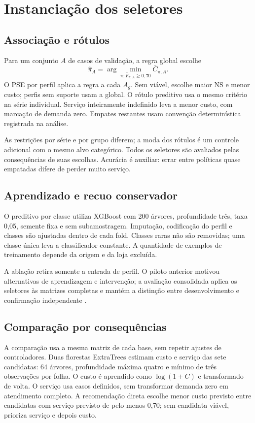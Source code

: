 \section{Instanciação dos seletores}
\label{sec:selecao_contextual}
\subsection{Associação e rótulos}
Para um conjunto $A$ de casos de validação, a regra global escolhe
\begin{equation}
 \hat\pi_A=\arg\min_{\pi:\bar F_{\pi,A}\geq0{,}70}\bar C_{\pi,A}.
 \label{eq:policy_selector}
\end{equation}
O PSE por perfil aplica a regra a cada $A_g$. Sem viável, escolhe maior NS e menor custo; perfis sem suporte usam a global. O rótulo preditivo usa o mesmo critério na série individual. Serviço inteiramente indefinido leva a menor custo, com marcação de demanda zero. Empates restantes usam convenção determinística registrada na análise.

As restrições por série e por grupo diferem; a moda dos rótulos é um controle adicional com o mesmo alvo categórico. Todos os seletores são avaliados pelas consequências de suas escolhas. Acurácia é auxiliar: errar entre políticas quase empatadas difere de perder muito serviço.

\subsection{Aprendizado e recuo conservador}
O preditivo por classe utiliza XGBoost com 200 árvores, profundidade três, taxa 0,05, semente fixa e sem subamostragem. Imputação, codificação do perfil e classes são ajustadas dentro de cada fold. Classes raras não são removidas; uma classe única leva a classificador constante. A quantidade de exemplos de treinamento depende da origem e da loja excluída.

A ablação retira somente a entrada de perfil. O piloto anterior motivou alternativas de aprendizagem e intervenção; a avaliação consolidada aplica os seletores às matrizes completas e mantém a distinção entre desenvolvimento e confirmação independente \citep{CawleyTalbot2010}.

\subsection{Comparação por consequências}
A comparação usa a mesma matriz de cada base, sem repetir ajustes de controladores. Duas florestas ExtraTrees estimam custo e serviço das sete candidatas: 64 árvores, profundidade máxima quatro e mínimo de três observações por folha. O custo é aprendido como $\log(1+C)$ e transformado de volta. O serviço usa casos definidos, sem transformar demanda zero em atendimento completo. A recomendação direta escolhe menor custo previsto entre candidatas com serviço previsto de pelo menos 0,70; sem candidata viável, prioriza serviço e depois custo.

